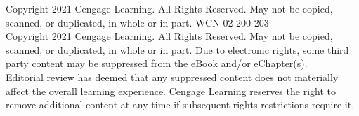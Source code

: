 \vfill
\begin{center}
{\fontsize{5.5pt}{7pt}\selectfont\color{black!60}
Copyright 2021 Cengage Learning. All Rights Reserved. May not be copied, scanned, or duplicated, in whole or in part. WCN 02-200-203\\
Copyright 2021 Cengage Learning. All Rights Reserved. May not be copied, scanned, or duplicated, in whole or in part. Due to electronic rights, some third party content may be suppressed from the eBook and/or eChapter(s).\\
Editorial review has deemed that any suppressed content does not materially affect the overall learning experience. Cengage Learning reserves the right to remove additional content at any time if subsequent rights restrictions require it.\par}
\end{center}
